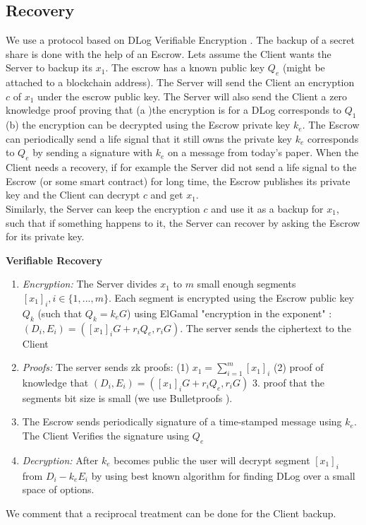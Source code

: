 \documentclass[runningheads]{llncs}
\begin{document}
\subsection{Recovery}  
We use a protocol based on DLog Verifiable Encryption \cite{cs03}. The backup of a secret share is done with the help of an Escrow. Lets assume the Client wants the Server to backup its $x_1$. The escrow has a known public key $Q_e$ (might be attached to a blockchain address). The Server will send the Client an encryption $c$ of $x_1$ under the escrow public key. The Server will also send the Client a zero knowledge proof proving that  (a )the encryption is for a DLog corresponds to $Q_1$ (b) the encryption can be decrypted using the Escrow private key $k_e$. The Escrow can periodically send a life signal that it still owns the private key $k_e$ corresponds to $Q_e$ by sending a signature with $k_e$ on a message from today's paper. When the Client needs a recovery, if for example the Server did not send a life signal to the Escrow (or some smart contract) for long time, the Escrow publishes its private key and the Client can decrypt $c$ and get $x_1$. \\
Similarly, the Server can keep the encryption $c$ and use it as a backup for $x_1$, such that if something happens to it, the Server can recover by asking the Escrow for its private key. 
\begin{mdframed}[userdefinedwidth = 12.3cm]
\textbf{Verifiable Recovery}
\begin{enumerate}

\item \textit{Encryption:} The Server divides $x_1$ to $m$ small enough segments $[x_1]_i, i\in \{1,...,m\}$. Each segment is encrypted using the Escrow public key $Q_k$ (such that $Q_k = k_eG$) using ElGamal "encryption in the exponent" : $(D_i, E_i) = ([x_1]_iG+r_iQ_e, r_iG)$. The server sends the ciphertext to the Client
\item \textit{Proofs:} The server sends zk proofs: (1)  $x_1 = \sum_{i=1}^{m}{[x_1]_i}$ (2)  proof of knowledge that $(D_i, E_i) = ([x_1]_iG+r_iQ_e, r_iG)$ 3. proof that the segments bit size is small (we use Bulletproofs \cite{bulletproof}).
\item The Escrow sends periodically signature of a time-stamped message using $k_e$. The Client Verifies the signature using $Q_e$
\item \textit{Decryption:} After $k_e$ becomes public the user will decrypt segment $[x_1]_i$ from $D_i - k_eE_i$ by using best known algorithm for finding DLog over a small space of options. 
\end{enumerate}
\end{mdframed}
We comment that a reciprocal treatment can be done for the Client backup.
\end{document}
